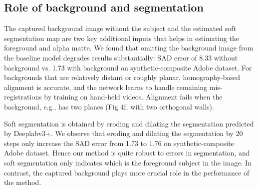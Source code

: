\documentclass[10pt,twocolumn,letterpaper]{article}
\begin{document}
\subsection{Role of background and segmentation}
\label{sec:back_seg}

The captured background image without the subject and the estimated soft segmentation map are two key additional inputs that helps in estimating the foreground and alpha matte. We found that omitting the background image from the baseline  model degrades results substantially: SAD error of 8.33 without background vs. 1.73 with background on synthetic-composite Adobe dataset. For backgrounds that are relatively distant or roughly planar, homography-based alignment is accurate, and the network learns to handle remaining mis-registrations by training on hand-held videos. Alignment fails when the background, e.g., has two planes (Fig 4f, with two orthogonal walls).

Soft segmentation is obtained by eroding and dilating the segmentation predicted by Deeplabv3+. We observe that eroding and dilating the segmentation by 20 steps only increase the SAD error from 1.73 to 1.76 on synthetic-composite Adobe dataset. Hence our method is quite robust to errors in segmentation, and soft segmentation only indicates which is the foreground subject in the image. In contrast, the captured background plays more crucial role in the performance of the method.



 \fi
\end{document}
